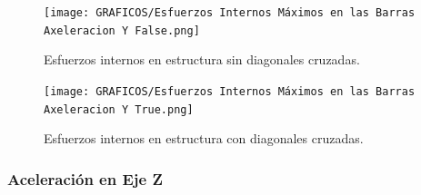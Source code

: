 \begin{figure}[H]
    \centering
    \begin{minipage}{0.45\textwidth}
        \centering
        \texttt{[image: GRAFICOS/Esfuerzos Internos Máximos en las Barras Axeleracion Y False.png]}
        \caption{Esfuerzos internos en estructura sin diagonales cruzadas.}
        \label{fig:imagen33}
    \end{minipage}
    \hfill
    \begin{minipage}{0.45\textwidth}
        \centering
        \texttt{[image: GRAFICOS/Esfuerzos Internos Máximos en las Barras Axeleracion Y True.png]}
        \caption{Esfuerzos internos en estructura con diagonales cruzadas.}
        \label{fig:imagen44}
    \end{minipage}
\end{figure}

\subsubsection{Aceleración en Eje Z}

